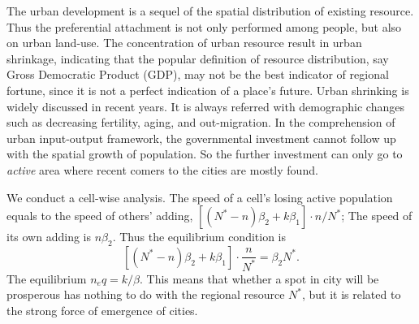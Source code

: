 \documentclass[aps,prl]{revtex4-2}
\begin{document}
The urban development is a sequel of the spatial distribution of existing resource. Thus the preferential attachment is not only performed among people, but also on urban land-use. The concentration of urban resource result in urban shrinkage, indicating that the popular definition of resource distribution, say Gross Democratic Product (GDP), may not be the best indicator of regional fortune, since it is not a perfect indication of a place's future. Urban shrinking is widely discussed in recent years. It is always referred with demographic changes such as decreasing fertility, aging, and out-migration\cite{haase2008urban}. In the comprehension of urban input-output framework, the governmental investment cannot follow up with the spatial growth of population. So the further investment can only go to \emph{active} area where recent comers to the cities are mostly found. 

We conduct a cell-wise analysis. The speed of a cell's losing active population equals to the speed of others' adding, $[(N^*-n)\beta_2 +k \beta_1]\cdot n/N^*$; The speed of its own adding is $n\beta_2$. Thus the equilibrium condition is \[ [(N^*-n)\beta_2+k\beta_1]\cdot \frac{n}{N^*} = \beta_2N^*. \] The equilibrium $n_eq = k/\beta$. This means that whether a spot in city will be prosperous  has nothing to do with the regional resource $N^*$, but it is related to the strong force of emergence of cities.


% 

    
\end{document}
